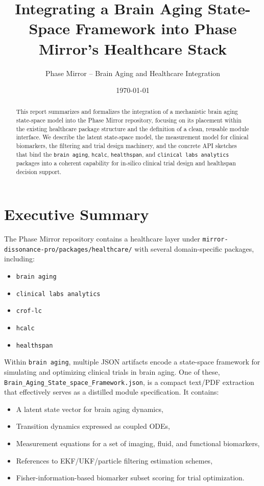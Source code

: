 \documentclass[11pt]{article}
\title{Integrating a Brain Aging State-Space Framework into Phase Mirror's Healthcare Stack}
\author{Phase Mirror -- Brain Aging and Healthcare Integration}
\date{\today}
\begin{document}
\maketitle

\begin{abstract}
This report summarizes and formalizes the integration of a mechanistic brain aging
state-space model into the Phase Mirror repository, focusing on its placement within
the existing healthcare package structure and the definition of a clean, reusable
module interface. We describe the latent state-space model, the measurement model for
clinical biomarkers, the filtering and trial design machinery, and the concrete API
sketches that bind the \texttt{brain aging}, \texttt{hcalc}, \texttt{healthspan}, and
\texttt{clinical labs analytics} packages into a coherent capability for in-silico
clinical trial design and healthspan decision support.
\end{abstract}

\tableofcontents

\section{Executive Summary}

The Phase Mirror repository contains a healthcare layer under
\texttt{mirror-dissonance-pro/packages/healthcare/} with several domain-specific
packages, including:
\begin{itemize}[noitemsep]
  \item \texttt{brain aging}
  \item \texttt{clinical labs analytics}
  \item \texttt{crof-lc}
  \item \texttt{hcalc}
  \item \texttt{healthspan}
\end{itemize}

Within \texttt{brain aging}, multiple JSON artifacts encode a state-space framework
for simulating and optimizing clinical trials in brain aging. One of these,
\texttt{Brain\_Aging\_State\_space\_Framework.json}, is a compact text/PDF extraction
that effectively serves as a distilled module specification. It contains:
\begin{itemize}[noitemsep]
  \item A latent state vector for brain aging dynamics,
  \item Transition dynamics expressed as coupled ODEs,
  \item Measurement equations for a set of imaging, fluid, and functional biomarkers,
  \item References to EKF/UKF/particle filtering estimation schemes,
  \item Fisher-information-based biomarker subset scoring for trial optimization.
\end{itemize}
\end{document}

